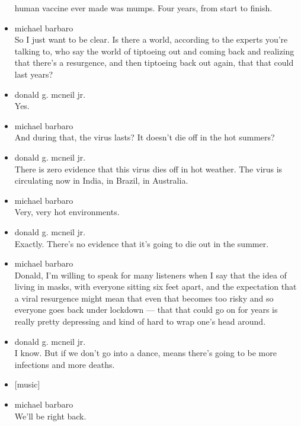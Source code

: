 \begin{itemize}
  human vaccine ever made was mumps. Four years, from start to finish.
\item
  michael barbaro\\
  So I just want to be clear. Is there a world, according to the experts
  you're talking to, who say the world of tiptoeing out and coming back
  and realizing that there's a resurgence, and then tiptoeing back out
  again, that that could last years?
\item
  donald g. mcneil jr.\\
  Yes.
\item
  michael barbaro\\
  And during that, the virus lasts? It doesn't die off in the hot
  summers?
\item
  donald g. mcneil jr.\\
  There is zero evidence that this virus dies off in hot weather. The
  virus is circulating now in India, in Brazil, in Australia.
\item
  michael barbaro\\
  Very, very hot environments.
\item
  donald g. mcneil jr.\\
  Exactly. There's no evidence that it's going to die out in the summer.
\item
  michael barbaro\\
  Donald, I'm willing to speak for many listeners when I say that the
  idea of living in masks, with everyone sitting six feet apart, and the
  expectation that a viral resurgence might mean that even that becomes
  too risky and so everyone goes back under lockdown --- that that could
  go on for years is really pretty depressing and kind of hard to wrap
  one's head around.
\item
  donald g. mcneil jr.\\
  I know. But if we don't go into a dance, means there's going to be
  more infections and more deaths.
\item
  {[}music{]}
\item
  michael barbaro\\
  We'll be right back.


\end{itemize}
